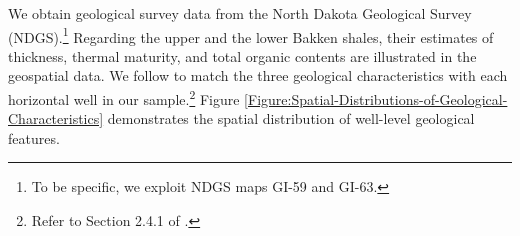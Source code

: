 We obtain geological survey data from the North Dakota Geological Survey (NDGS).\footnote{To be specific, we exploit NDGS maps GI-59 and GI-63.}  Regarding the upper and the lower Bakken shales, their estimates of thickness, thermal maturity, and total organic contents are illustrated in the geospatial data. We follow \cite{Experiential-and-Social-Learning-in-Firms_Covert_2015} to match the three geological characteristics with each horizontal well in our sample.\footnote{Refer to Section 2.4.1 of \cite{Experiential-and-Social-Learning-in-Firms_Covert_2015}.} Figure \ref{Figure:Spatial-Distributions-of-Geological-Characteristics} demonstrates the spatial distribution of well-level geological features. 
